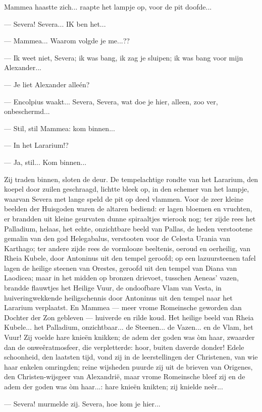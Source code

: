 \documentclass[a4paper, 12pt, oneside, dutch]{article}
\begin{document}
Mammea haastte zich... raapte het lampje op, voor de pit doofde...

--- Severa! Severa... IK ben het...

--- Mammea... Waarom volgde je me...??

--- Ik weet niet, Severa; ik was bang, ik zag je sluipen; ik was bang voor mijn Alexander...

--- Je liet Alexander alleén?

--- Encolpius waakt... Severa, Severa, wat doe je hier, alleen, zoo ver, onbeschermd...

--- Stil, stil Mammea: kom binnen...

--- In het Lararium!?

--- Ja, stil... Kom binnen...

Zij traden binnen, sloten de deur. De tempelachtige rondte van het Lararium, den koepel door zuilen geschraagd, lichtte bleek op, in den schemer van het lampje, waarvan Severa met lange speld de pit op deed vlammen. Voor de zeer kleine beelden der Huisgoden waren de altaren bediend: er lagen bloemen en vruchten, er brandden uit kleine geurvaten dunne spiraaltjes wierook nog; ter zijde rees het Palladium, helaas, het echte, onzichtbare beeld van Pallas, de heden verstootene gemalin van den god Helegabalus, verstooten voor de Celesta Urania van Karthago; ter andere zijde rees de vormlooze beeltenis, oeroud en oerheilig, van Rheia Kubele, door Antoninus uit den tempel geroofd; op een lazuursteenen tafel lagen de heilige steenen van Orestes, geroofd uit den tempel van Diana van Laodicea; maar in het midden op bronzen drievoet, tusschen Aeneas' vazen, brandde flauwtjes het Heilige Vuur, de ondoofbare Vlam van Vesta, in huiveringwekkende heiligschennis door Antoninus uit den tempel naar het Lararium verplaatst. En Mammea --- meer vrome Romeinsche geworden dan Dochter der Zon gebleven --- huiverde en rilde koud. Het heilige beeld van Rheia Kubele... het Palladium, onzichtbaar... de Steenen... de Vazen... en de Vlam, het Vuur! Zij voelde hare knieën knikken; de adem der goden was òm haar, zwaarder dan de onweêratmosfeer, die verpletterde: hoor, buiten daverde donder! Edele schoonheid, den laatsten tijd, vond zij in de leerstellingen der Christenen, van wie haar enkelen omringden; reine wijsheden puurde zij uit de brieven van Origenes, den Christen-wijsgeer van Alexandrië, maar vrome Romeinsche bleef zij en de adem der goden was òm haar...: hare knieën knikten; zij knielde neêr...

--- Severa! murmelde zij. Severa, hoe kom je hier...
\end{document}
